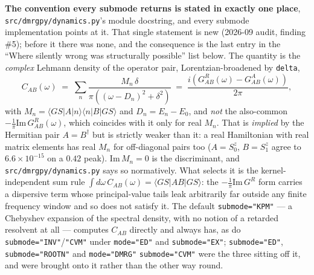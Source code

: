 \documentclass[11pt]{article}
\begin{document}
\textbf{The convention every submode returns is stated in exactly one
place}, \texttt{src/dmrgpy/dynamics.py}'s module docstring, and every
submode implementation points at it. That single statement is new
(2026-09 audit, finding \#5); before it there was none, and the
consequence is the last entry in the ``Where silently wrong was
structurally possible'' list below. The quantity is the \emph{complex}
Lehmann density of the operator pair, Lorentzian-broadened by
\texttt{delta},
\[
  C_{AB}(\omega) \;=\; \sum_n \frac{M_n\,\delta}
      {\pi\left((\omega-D_n)^2+\delta^2\right)}
  \;=\; \frac{i\left(G^R_{AB}(\omega)-G^A_{AB}(\omega)\right)}{2\pi},
\]
with $M_n = \langle GS|A|n\rangle\langle n|B|GS\rangle$ and
$D_n = E_n-E_0$, and \emph{not} the also-common
$-\frac{1}{\pi}\mathrm{Im}\,G^R_{AB}(\omega)$, which coincides with it
only for real $M_n$. That is \emph{implied} by the Hermitian pair
$A = B^\dagger$ but is strictly weaker than it: a real Hamiltonian with
real matrix elements has real $M_n$ for off-diagonal pairs too
($A = S^z_0$, $B = S^z_1$ agree to $6.6\times10^{-15}$ on a $0.42$
peak). $\mathrm{Im}\,M_n = 0$ is the discriminant, and
\texttt{src/dmrgpy/dynamics.py} says so normatively. What selects it is the kernel-independent sum rule
$\int d\omega\,C_{AB}(\omega) = \langle GS|AB|GS\rangle$: the
$-\frac{1}{\pi}\mathrm{Im}\,G^R$ form carries a dispersive term whose
principal-value tails leak arbitrarily far outside any finite frequency
window and so does not satisfy it. The default \texttt{submode="KPM"} ---
a Chebyshev expansion of the spectral density, with no notion of a
retarded resolvent at all --- computes $C_{AB}$ directly and always has,
as do \texttt{submode="INV"}/\texttt{"CVM"} under \texttt{mode="ED"} and
\texttt{submode="EX"}; \texttt{submode="ED"}, \texttt{submode="ROOTN"}
and \texttt{mode="DMRG"} \texttt{submode="CVM"} were the three sitting
off it, and were brought onto it rather than the other way round.
\end{document}
